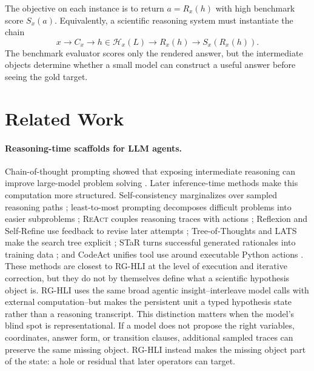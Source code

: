 \documentclass[letterpaper]{article}
\newcommand{\methodshort}{\textsc{RG-HLI}\xspace}
\newcommand{\react}{\textsc{ReAct}\xspace}
\newcommand{\codeact}{CodeAct\xspace}
\begin{document}
The objective on each instance is to return $a=R_x(h)$ with high benchmark
score $S_x(a)$. Equivalently, a scientific reasoning system must instantiate
the chain
\begin{equation}
  x \rightarrow C_x \rightarrow h\in\mathcal{H}_x(L)
  \rightarrow R_x(h) \rightarrow S_x(R_x(h)).
\end{equation}
The benchmark evaluator scores only the rendered answer, but the intermediate
objects determine whether a small model can construct a useful answer before
seeing the gold target.

\section{Related Work}

\paragraph{Reasoning-time scaffolds for LLM agents.}
Chain-of-thought prompting showed that exposing intermediate reasoning can
improve large-model problem solving \citep{cot}. Later inference-time methods
make this computation more structured. Self-consistency marginalizes over
sampled reasoning paths \citep{selfconsistency}; least-to-most prompting
decomposes difficult problems into easier subproblems \citep{leasttomost};
\react couples reasoning traces with actions \citep{react}; Reflexion and
Self-Refine use feedback to revise later attempts
\citep{reflexion,selfrefine}; Tree-of-Thoughts and LATS make the search tree
explicit \citep{tot,lats}; STaR turns successful generated rationales into
training data \citep{star}; and \codeact unifies tool use around executable
Python actions \citep{codeact}. These methods are closest to \methodshort at
the level of execution and iterative correction, but they do not by themselves
define what a scientific hypothesis object is. \methodshort uses the same broad
agentic insight--interleave model calls with external computation--but makes
the persistent unit a typed hypothesis state rather than a reasoning
transcript.
This distinction matters when the model's blind spot is representational. If a
model does not propose the right variables, coordinates, answer form, or
transition clauses, additional sampled traces can preserve the same missing
object. \methodshort instead makes the missing object part of the state: a hole or
residual that later operators can target.
\end{document}
